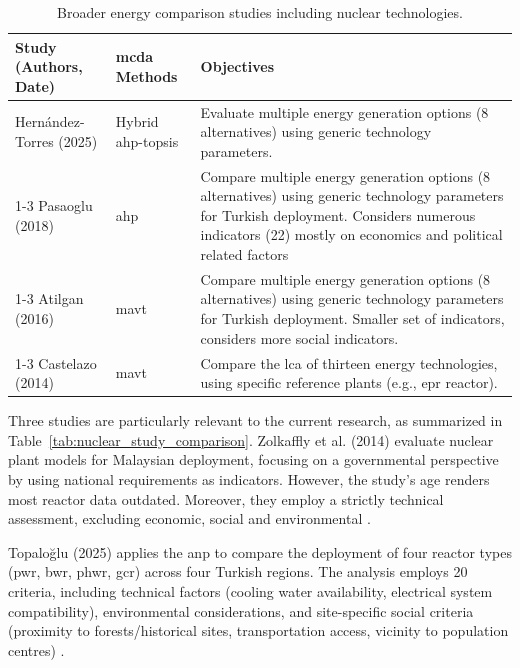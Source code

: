 \begin{table}[htbp]
    \centering
    \begin{tabularx}{\textwidth}{XXX}
        \toprule
        \textbf{Study (Authors, Date)} & \textbf{\gls{mcda} Methods} & \textbf{Objectives} \\
        \midrule
        Hernández-Torres (2025) \cite{HERNANDEZTORRES2025122481} & Hybrid \gls{ahp}-\gls{topsis} & Evaluate multiple energy generation options (8 alternatives) using generic technology parameters. \\
        \cmidrule(lr){1-3}
        Pasaoglu (2018) \cite{PASAOGLU2018654} & \gls{ahp} & Compare multiple energy generation options (8 alternatives) using generic technology parameters for Turkish deployment. Considers numerous indicators (22) mostly on economics and political related factors\\
        \cmidrule(lr){1-3}
        Atilgan (2016) \cite{ATILGAN2016168} & \gls{mavt} & Compare multiple energy generation options (8 alternatives) using generic technology parameters for Turkish deployment. Smaller set of indicators, considers more social indicators. \\
        \cmidrule(lr){1-3}
        Castelazo (2014) \cite{SANTOYOCASTELAZO2014119} & \gls{mavt} & Compare the \gls{lca} of thirteen energy technologies, using specific reference plants (e.g., \gls{epr} reactor). \\
        \bottomrule
    \end{tabularx}
    \caption{Broader energy comparison studies including nuclear technologies.}
    \label{tab:broader_energy_comparison}
\end{table}

Three studies are particularly relevant to the current research, as summarized in Table~\ref{tab:nuclear_study_comparison}. Zolkaffly et al. (2014) evaluate nuclear plant models for Malaysian deployment, focusing on a governmental perspective by using national requirements as indicators. However, the study's age renders most reactor data outdated. Moreover, they employ a strictly technical assessment, excluding economic, social and environmental \cite{10.1063/1.4866099}.

Topaloğlu (2025) applies the \gls{anp} to compare the deployment of four reactor types (\gls{pwr}, \gls{bwr}, \gls{phwr}, \gls{gcr}) across four Turkish regions. The analysis employs 20 criteria, including technical factors (cooling water availability, electrical system compatibility), environmental considerations, and site-specific social criteria (proximity to forests/historical sites, transportation access, vicinity to population centres) \cite{TOPALOGLU2025103228}. 

